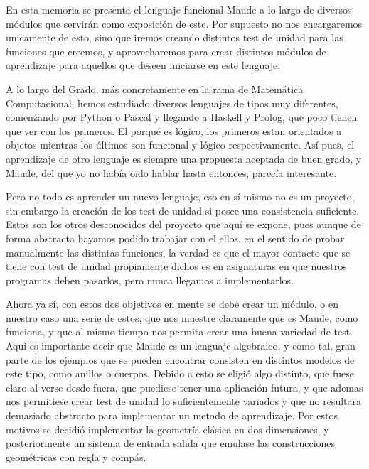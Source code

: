 
En esta memoria se presenta el lenguaje funcional Maude a lo largo de diversos módulos que servirán como exposición de este. Por supuesto no nos encargaremos unicamente de esto, sino que iremos creando distintos test de unidad para las funciones que creemos, y aprovecharemos para crear distintos módulos de aprendizaje para aquellos que deseen iniciarse en este lenguaje.\par

A lo largo del Grado, más concretamente en la rama de Matemática Computacional, hemos estudiado diversos lenguajes de tipos muy diferentes, comenzando por Python o Pascal y llegando a Haskell y Prolog, que poco tienen que ver con los primeros. El porqué es lógico, los primeros estan orientados a objetos mientras los últimos son funcional y lógico respectivamente. Así pues, el aprendizaje de otro lenguaje es siempre una propuesta aceptada de buen grado, y Maude, del que yo no había oido hablar hasta entonces, parecía interesante.\par

Pero no todo es aprender un nuevo lenguaje, eso en sí mismo no es un proyecto, sin embargo la creación de los test de unidad si posee una consistencia suficiente. Estos son los otros desconocidos del proyecto que aquí se expone, pues aunque de forma abstracta hayamos podido trabajar con el ellos, en el sentido de probar manualmente las distintas funciones, la verdad es que el mayor contacto que se tiene con test de unidad propiamente dichos es en asignaturas en que nuestros programas deben pasarlos, pero nunca llegamos a implementarlos. \par

Ahora ya sí, con estos dos objetivos en mente se debe crear un módulo, o en nuestro caso una serie de estos, que nos muestre claramente que es Maude, como funciona, y que al mismo tiempo nos permita crear una buena variedad de test. Aquí es importante decir que Maude es un lenguaje algebraico, y como tal, gran parte de los ejemplos que se pueden encontrar consisten en distintos modelos de este tipo, como anillos o cuerpos. Debido a esto se eligió algo distinto, que fuese claro al verse desde fuera, que puediese tener una aplicación futura, y que ademas nos permitiese crear test de unidad lo suficientemente variados y que no resultara demasiado abstracto para implementar un metodo de aprendizaje. Por estos motivos se decidió implementar la geometría clásica en dos dimensiones, y posteriormente un sistema de entrada salida que emulase las construcciones geométricas con regla y compás. \par

